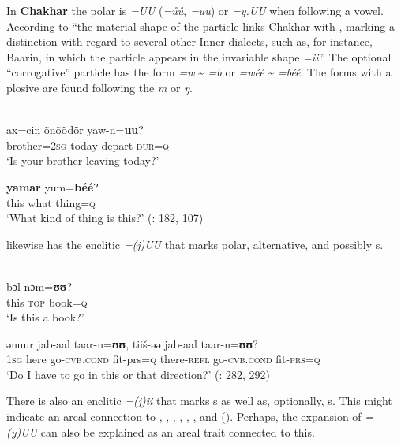 In \textbf{Chakhar } the polar  is \textit{=UU} (\textit{=ůů}, \textit{=uu}) or \textit{=y.UU} when following a vowel. According to \citet[182]{Sechenbaatar2003} “the material shape of the  particle links Chakhar with , marking a distinction with regard to several other Inner  dialects, such as, for instance, Baarin, in which the  particle appears in the invariable shape \textit{=ii}.” The optional “corrogative” particle has the form \textit{=w} {\textasciitilde} \textit{=b} or \textit{=wéé} {\textasciitilde} \textit{=béé}. The forms with a plosive are found following the  \textit{m} or \textit{ŋ}.

\ea%
    \label{ex:mong:23}
    \\
    \ea
    \gll ax=cin    õnõõdõr  yaw-n=\textbf{{uu}}?\\
    brother=2\textsc{sg}  today    depart-\textsc{dur}=\textsc{q}\\
    \glt ‘Is your brother leaving today?’
    
    \ex
     \textbf{{yamar}} {yum=}\textbf{{béé}}?\\
    this  what  thing=\textsc{q}\\
    \glt ‘What kind of thing is this?’ (\citealt{Sechenbaatar2003}: 182, 107)
    \z
    \z

\textbf{ } likewise has the enclitic \textit{=(j)UU} that marks polar, alternative, and possibly s.

\ea%
    \label{ex:mong:24}
     \\
    \ea
     {bɔl} {nɔm=}\textbf{{ʊʊ}}?\\
    this  \textsc{top}  book=\textsc{q}\\
    \glt ‘Is this a book?’
    
    \ex
     {ənuur} {jab-aal} {taar-n=}\textbf{{ʊʊ}}, {tiiš-əə} {jab-aal} {taar-n=}\textbf{{ʊʊ}}?\\
    1\textsc{sg}  here  go-\textsc{cvb.cond}  fit-prs=\textsc{q} there-\textsc{refl}  go-\textsc{cvb.cond}  fit-\textsc{prs}=\textsc{q}\\
    \glt ‘Do I have to go in this or that direction?’ (\citealt{Yamakoshi2015}: 282, 292)
    \z
    \z

There is also an enclitic \textit{=(j)ii} that marks s as well as, optionally, s. This might indicate an areal connection to , , , , , , and  (). Perhaps, the expansion of  \textit{=(y)UU} can also be explained as an areal trait connected to this.

